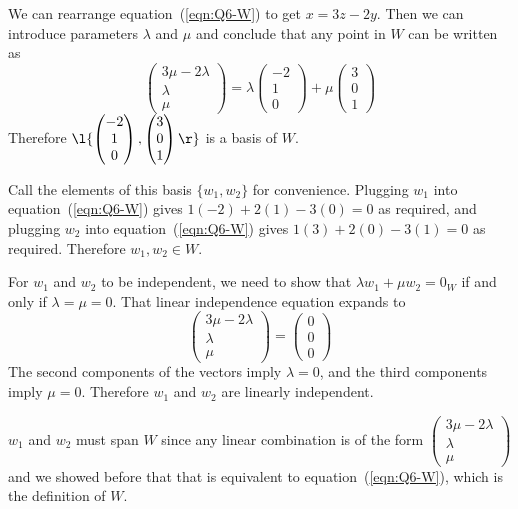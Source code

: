 \documentclass[a4paper]{article}
\begin{document}
We can rearrange equation~(\ref{eqn:Q6-W}) to get $x = 3z - 2y$. Then we can introduce parameters $\lambda$ and $\mu$ and conclude that any point in $W$ can be written as \[
\begin{pmatrix}3 \mu - 2 \lambda \\ \lambda \\ \mu\end{pmatrix}
= \lambda \begin{pmatrix}-2 \\ 1 \\ 0\end{pmatrix}
+ \mu \begin{pmatrix}3 \\ 0 \\ 1\end{pmatrix}
\] Therefore $\l\{ \begin{pmatrix}- 2 \\ 1 \\ 0\end{pmatrix}, \begin{pmatrix}3 \\ 0 \\ 1\end{pmatrix} \r\}$ is a basis of $W$.

Call the elements of this basis $\{ w_1, w_2 \}$ for convenience. Plugging $w_1$ into equation~(\ref{eqn:Q6-W}) gives $1(-2) + 2(1)  - 3(0) = 0$ as required, and plugging $w_2$ into equation~(\ref{eqn:Q6-W}) gives $1(3) + 2(0) - 3(1) = 0$ as required. Therefore $w_1, w_2 \in W$.

For $w_1$ and $w_2$ to be independent, we need to show that $\lambda w_1 + \mu w_2 = 0_W$ if and only if $\lambda = \mu = 0$. That linear independence equation expands to \[
\begin{pmatrix}3 \mu - 2 \lambda \\ \lambda \\ \mu\end{pmatrix}
= \begin{pmatrix}0 \\ 0 \\ 0\end{pmatrix}
\] The second components of the vectors imply $\lambda = 0$, and the third components imply $\mu = 0$. Therefore $w_1$ and $w_2$ are linearly independent.

$w_1$ and $w_2$ must span $W$ since any linear combination is of the form $\begin{pmatrix}3 \mu - 2 \lambda \\ \lambda \\ \mu\end{pmatrix}$ and we showed before that that is equivalent to equation~(\ref{eqn:Q6-W}), which is the definition of $W$.
\end{document}
